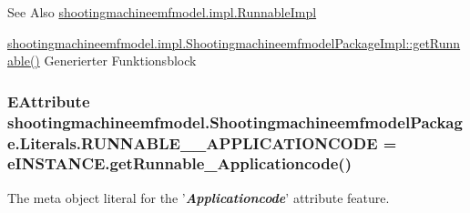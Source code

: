\begin{DoxySeeAlso}{See Also}
\hyperlink{classshootingmachineemfmodel_1_1impl_1_1_runnable_impl}{shootingmachineemfmodel.\-impl.\-Runnable\-Impl} 

\hyperlink{classshootingmachineemfmodel_1_1impl_1_1_shootingmachineemfmodel_package_impl_ab5b1e51f5d072672e318e4eb83d48e04}{shootingmachineemfmodel.\-impl.\-Shootingmachineemfmodel\-Package\-Impl\-::get\-Runnable()} Generierter Funktionsblock 
\end{DoxySeeAlso}
\hypertarget{interfaceshootingmachineemfmodel_1_1_shootingmachineemfmodel_package_1_1_literals_adc064ca355e28e0852dc372bece4a75c}{
\subsubsection[{R\-U\-N\-N\-A\-B\-L\-E\-\_\-\-\_\-\-A\-P\-P\-L\-I\-C\-A\-T\-I\-O\-N\-C\-O\-D\-E}]{\setlength{\rightskip}{0pt plus 5cm}E\-Attribute shootingmachineemfmodel.\-Shootingmachineemfmodel\-Package.\-Literals.\-R\-U\-N\-N\-A\-B\-L\-E\-\_\-\-\_\-\-A\-P\-P\-L\-I\-C\-A\-T\-I\-O\-N\-C\-O\-D\-E = e\-I\-N\-S\-T\-A\-N\-C\-E.\-get\-Runnable\-\_\-\-Applicationcode()}}\label{interfaceshootingmachineemfmodel_1_1_shootingmachineemfmodel_package_1_1_literals_adc064ca355e28e0852dc372bece4a75c}
The meta object literal for the '{\itshape {\bfseries Applicationcode}}' attribute feature.

